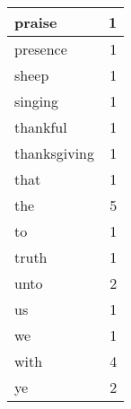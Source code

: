 \begin{center}
\begin{longtable}{l|r}
praise & 1 \\ \hline
presence & 1 \\ \hline
sheep & 1 \\ \hline
singing & 1 \\ \hline
thankful & 1 \\ \hline
thanksgiving & 1 \\ \hline
that & 1 \\ \hline
the & 5 \\ \hline
to & 1 \\ \hline
truth & 1 \\ \hline
unto & 2 \\ \hline
us & 1 \\ \hline
we & 1 \\ \hline
with & 4 \\ \hline
ye & 2 \\ \hline
\end{longtable}
\end{center}



\normalsize



